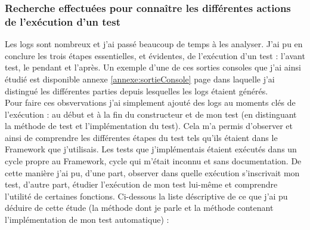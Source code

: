 \subsubsection{Recherche effectu\'{e}es pour conna\^{i}tre les diff\'{e}rentes actions de l'ex\'{e}cution d'un test}
Les logs sont nombreux et j'ai pass\'{e} beaucoup de temps \`{a} les analyser. J'ai pu en conclure les trois \'{e}tapes essentielles, et \'{e}videntes, de l'ex\'{e}cution d'un test : l'avant test, le pendant et l'apr\`{e}s. Un exemple d'une de ces sorties consoles que j'ai ainsi \'{e}tudi\'{e} est disponible annexe \ref{annexe:sortieConsole} page \pageref{annexe:sortieConsole} dans laquelle j'ai distingu\'{e} les diff\'{e}rentes parties depuis lesquelles les logs \'{e}taient g\'{e}n\'{e}r\'{e}s.\\
Pour faire ces obsvervations j'ai simplement ajout\'{e} des logs au moments cl\'{e}s de l'ex\'{e}cution : au d\'{e}but et \`{a} la fin du constructeur et de mon test (en distinguant la m\'{e}thode de test et l'impl\'{e}mentation du test). Cela m'a permis d'observer et ainsi de comprendre les diff\'{e}rentes \'{e}tapes du test tels qu'ils \'{e}taient dans le Framework que j'utilisais. Les tests que j'impl\'{e}mentais \'{e}taient ex\'{e}cut\'{e}s dans un cycle propre au Framework, cycle qui m'\'{e}tait inconnu et sans documentation. De cette mani\`{e}re j'ai pu, d'une part, observer dans quelle ex\'{e}cution s'inscrivait mon test, d'autre part, \'{e}tudier l'ex\'{e}cution de mon test lui-m\^{e}me et comprendre l'utilit\'{e} de certaines fonctions. Ci-dessous la liste d\'{e}scriptive de ce que j'ai pu d\'{e}duire de cette \'{e}tude (la m\'{e}thode  dont je parle et la m\'{e}thode contenant l'impl\'{e}mentation de mon test automatique) :

